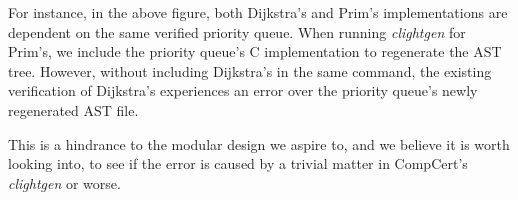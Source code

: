 For instance, in the above figure, both Dijkstra's and Prim's implementations are dependent on the same verified priority queue. When running \textit{clightgen} for Prim's, we include the priority queue's C implementation to regenerate the AST tree. However, without including Dijkstra's in the same command, the existing verification of Dijkstra's experiences an error over the priority queue's newly regenerated AST file.

This is a hindrance to the modular design we aspire to, and we believe it is worth looking into, to see if the error is caused by a trivial matter in CompCert's \textit{clightgen} or worse.


